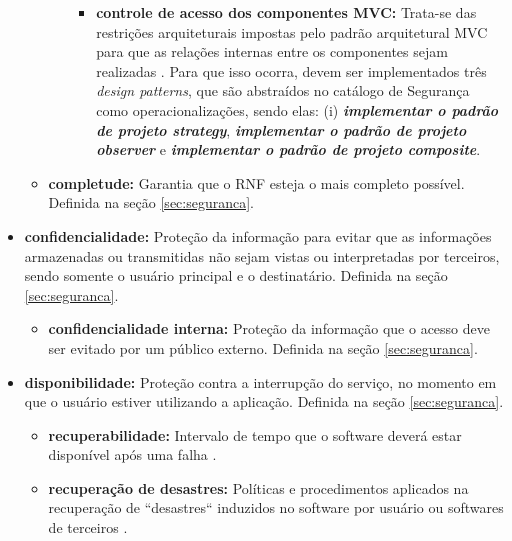 \begin{itemize}
\begin{itemize}
\begin{itemize}
\begin{itemize}
				\item \textbf{controle de acesso dos componentes MVC:} Trata-se das restrições arquiteturais impostas pelo padrão arquitetural MVC para que as relações internas entre os componentes sejam realizadas \cite{buschmann1996system}. Para que isso ocorra, devem ser implementados três \textit{design patterns}, que são abstraídos no catálogo de Segurança como operacionalizações, sendo elas: (i) \textbf{\textit{implementar o padrão de projeto strategy}}, \textbf{\textit{implementar o padrão de projeto observer}} e \textbf{\textit{implementar o padrão de projeto composite}}.
				
			\end{itemize}
						
		\end{itemize}
		
		\item \textbf{completude:} Garantia que o RNF esteja o mais completo possível. Definida na seção \ref{sec:seguranca}.
	\end{itemize}
	
	\item \textbf{confidencialidade:} Proteção da informação para evitar que as informações armazenadas ou transmitidas não sejam vistas ou interpretadas por terceiros, sendo somente o usuário principal e o destinatário. Definida na seção \ref{sec:seguranca}.
	
	\begin{itemize}
		
		\item \textbf{confidencialidade interna:} Proteção da informação que o acesso deve ser evitado por um público externo. Definida na seção \ref{sec:seguranca}.
		
	\end{itemize}
	 
	 \item \textbf{disponibilidade:} Proteção contra a interrupção do serviço, no momento em que o usuário estiver utilizando a aplicação. Definida na seção \ref{sec:seguranca}.
	 
	 \begin{itemize}
	 		
	 		\item \textbf{recuperabilidade:} Intervalo de tempo que o software deverá estar disponível após uma falha \cite{benitti2015taxonomia}.
	 	
	 		\item \textbf{recuperação de desastres:} Políticas e procedimentos aplicados na recuperação de ``desastres`` induzidos no software por usuário ou softwares de terceiros \cite{benitti2015taxonomia}.
	 		

\end{itemize}
\end{itemize}
